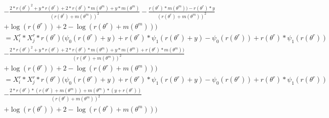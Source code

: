 \documentclass[bibliography=totoc,10pt]{scrartcl}
\begin{document}
\begin{equation}
\begin{split}
&- \frac{2*r(\theta^r)^2 + y*r(\theta^r) + 2*r(\theta^r)*m(\theta^m)+y*m(\theta^m)}{(r(\theta^r)+m(\theta^m))^2} - \frac{ r(\theta^r)*m(\theta^m)) - r(\theta^r)*y}{(r(\theta^r)+m(\theta^m))^2} \\
&+ \log(r(\theta^r)) + 2-  \log(r(\theta^r)+m(\theta^m)) \bigg) \\
&=X^r_{i} * X^r_{j} * r(\theta^r) \bigg( \psi_0(r(\theta^r)+y) + r(\theta^r) * \psi_1(r(\theta^r)+y) - \psi_0(r(\theta^r)) + r(\theta^r) * \psi_1(r(\theta^r)) \\
&- \frac{2*r(\theta^r)^2 + y*r(\theta^r) + 2*r(\theta^r)*m(\theta^m)+y*m(\theta^m)+r(\theta^r)*m(\theta^m))}{(r(\theta^r)+m(\theta^m))^2}\\
&+ \log(r(\theta^r)) + 2-  \log(r(\theta^r)+m(\theta^m)) \bigg) \\
&=X^r_{i} * X^r_{j} * r(\theta^r) \bigg( \psi_0(r(\theta^r)+y) + r(\theta^r) * \psi_1(r(\theta^r)+y) - \psi_0(r(\theta^r)) + r(\theta^r) * \psi_1(r(\theta^r)) \\
&- \frac{2*r(\theta^r)*(r(\theta^r)+m(\theta^m)) + m(\theta^m)*(y+r(\theta^r))}{(r(\theta^r)+m(\theta^m))^2}\\
&+ \log(r(\theta^r)) + 2-  \log(r(\theta^r)+m(\theta^m)) \bigg) \\
\end{split}
\end{equation}
\end{document}
